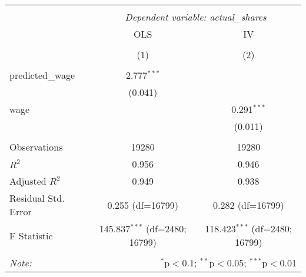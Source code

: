 \begin{table}[!htbp] \centering
\begin{tabular}{@{\extracolsep{5pt}}lcc}
\\[-1.8ex]\hline
\hline \\[-1.8ex]
& \multicolumn{2}{c}{\textit{Dependent variable: actual\_shares}} \
\cr \cline{2-3}
\\[-1.8ex] & \multicolumn{1}{c}{OLS} & \multicolumn{1}{c}{IV}  \\
\\[-1.8ex] & (1) & (2) \\
\hline \\[-1.8ex]
 predicted\_wage & 2.777$^{***}$ & \\
& (0.041) & \\
 wage & & 0.291$^{***}$ \\
& & (0.011) \\
\hline \\[-1.8ex]
 Observations & 19280 & 19280 \\
 $R^2$ & 0.956 & 0.946 \\
 Adjusted $R^2$ & 0.949 & 0.938 \\
 Residual Std. Error & 0.255 (df=16799) & 0.282 (df=16799) \\
 F Statistic & 145.837$^{***}$ (df=2480; 16799) & 118.423$^{***}$ (df=2480; 16799) \\
\hline
\hline \\[-1.8ex]
\textit{Note:} & \multicolumn{2}{r}{$^{*}$p$<$0.1; $^{**}$p$<$0.05; $^{***}$p$<$0.01} \\
\end{tabular}
\end{table}